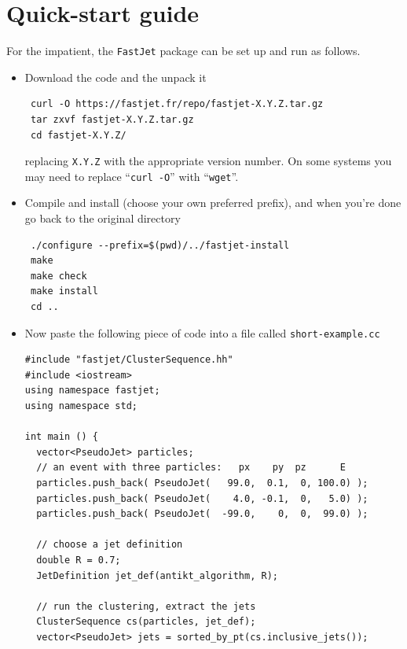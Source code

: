 \documentclass[12pt,a4]{article}
\newcommand{\fastjet}{\texttt{FastJet}\xspace}
\newcommand{\ttt}[1]{{\small\texttt{#1}}}
\begin{document}
\section{Quick-start guide}
\label{sec:quick-start}

For the impatient, the \fastjet package can be set up and run as follows.

\begin{itemize}
\item Download the code and the unpack it
\begin{verbatim}
 curl -O https://fastjet.fr/repo/fastjet-X.Y.Z.tar.gz 
 tar zxvf fastjet-X.Y.Z.tar.gz
 cd fastjet-X.Y.Z/
\end{verbatim}
replacing \ttt{X.Y.Z} with the appropriate version number. On some
systems you may need to replace ``\texttt{curl -O}'' with
``\texttt{wget}''. 

\item Compile and install (choose your own preferred prefix), and when 
you're done go back to the original directory
\begin{verbatim}
 ./configure --prefix=$(pwd)/../fastjet-install
 make
 make check
 make install
 cd ..
\end{verbatim}

\item
Now paste the following piece of code into a file called \tt{short-example.cc}
\begin{lstlisting}
#include "fastjet/ClusterSequence.hh"
#include <iostream>
using namespace fastjet;
using namespace std;

int main () {
  vector<PseudoJet> particles;
  // an event with three particles:   px    py  pz      E
  particles.push_back( PseudoJet(   99.0,  0.1,  0, 100.0) ); 
  particles.push_back( PseudoJet(    4.0, -0.1,  0,   5.0) ); 
  particles.push_back( PseudoJet(  -99.0,    0,  0,  99.0) );

  // choose a jet definition
  double R = 0.7;
  JetDefinition jet_def(antikt_algorithm, R);

  // run the clustering, extract the jets
  ClusterSequence cs(particles, jet_def);
  vector<PseudoJet> jets = sorted_by_pt(cs.inclusive_jets());


\end{lstlisting}
\end{itemize}
\end{document}
